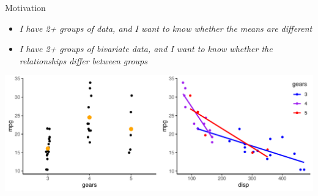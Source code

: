 \documentclass[
  ignorenonframetext,
  aspectratio=169]{beamer}
\providecommand{\tightlist}{%
  \setlength{\itemsep}{0pt}\setlength{\parskip}{0pt}}
\begin{document}
\begin{frame}{Motivation}
\protect\hypertarget{motivation-1}{}
\begin{itemize}
\tightlist
\item
  \emph{I have 2+ groups of data, and I want to know whether the means
  are different}
\end{itemize}

\begin{itemize}
\tightlist
\item
  \emph{I have 2+ groups of bivariate data, and I want to know whether
  the relationships differ between groups}
\end{itemize}

\includegraphics{03-Lecture_files/figure-beamer/examplePlots2-1.pdf}
\end{frame}
\end{document}
